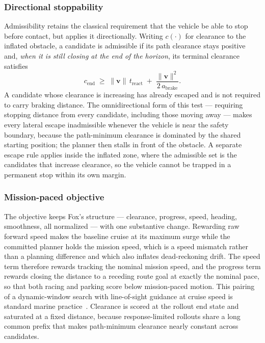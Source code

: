 \subsubsection{Directional stoppability}
Admissibility retains the classical requirement that the vehicle be able to
stop before contact, but applies it directionally. Writing $c(\cdot)$ for
clearance to the inflated obstacle, a candidate is admissible if its path
clearance stays positive and, \emph{when it is still closing at the end of
the horizon}, its terminal clearance satisfies
\begin{equation}
  c_{\mathrm{end}} \;\geq\; \lVert \mathbf{v} \rVert\, t_{\mathrm{react}}
    \;+\; \frac{\lVert \mathbf{v} \rVert^{2}}{2\,a_{\mathrm{brake}}} .
  \label{eq:stop}
\end{equation}
A candidate whose clearance is increasing has already escaped and is not
required to carry braking distance. The omnidirectional form of this test ---
requiring stopping distance from every candidate, including those moving away
--- makes every lateral escape inadmissible whenever the vehicle is near the
safety boundary, because the path-minimum clearance is dominated by the
shared starting position; the planner then stalls in front of the obstacle.
A separate escape rule applies inside the inflated zone, where the admissible
set is the candidates that increase clearance, so the vehicle cannot be
trapped in a permanent stop within its own margin.

\subsubsection{Mission-paced objective}
The objective keeps Fox's structure --- clearance, progress, speed, heading,
smoothness, all normalized --- with one substantive change. Rewarding raw
forward speed makes the baseline cruise at its maximum surge while the
committed planner holds the mission speed, which is a speed mismatch rather
than a planning difference and which also inflates dead-reckoning drift. The
speed term therefore rewards tracking the nominal mission speed, and the
progress term rewards closing the distance to a receding route goal at
exactly the nominal pace, so that both racing and parking score below
mission-paced motion. This pairing of a dynamic-window search with
line-of-sight guidance at cruise speed is standard marine
practice~\cite{eriksen2016amodifie}. Clearance is scored at the rollout end
state and saturated at a fixed distance, because response-limited rollouts
share a long common prefix that makes path-minimum clearance nearly constant
across candidates.

